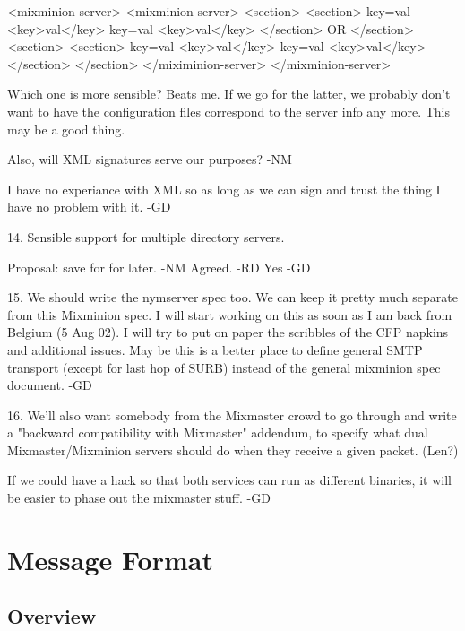     <mixminion-server>            <mixminion-server>
      <section>                      <section>
      key=val                           <key>val</key>
      key=val                           <key>val</key>
      </section>         OR          </section>        
      <section>                      <section>
      key=val                           <key>val</key>
      key=val                           <key>val</key>
      </section>                     </section>        
    </miximinion-server>         </mixminion-server>

    Which one is more sensible?  Beats me.  If we go for the latter,
    we probably don't want to have the configuration files correspond
    to the server info any more.  This may be a good thing.

    Also, will XML signatures serve our purposes? -NM

    I have no experiance with XML so as long as we can sign and trust
    the thing I have no problem with it. -GD

14. Sensible support for multiple directory servers.

    Proposal: save for for later. -NM
    Agreed. -RD
    Yes -GD

15. We should write the nymserver spec too. We can keep it pretty much
    separate from this Mixminion spec.
    I will start working on this as soon as I am back from Belgium (5
    Aug 02). I will try to put on paper the scribbles of the CFP
    napkins and additional issues. May be this is a better place to
    define general SMTP transport (except for last hop of SURB)
    instead of the general mixminion spec document. -GD

16. We'll also want somebody from the Mixmaster crowd to go through and
    write a "backward compatibility with Mixmaster" addendum, to specify
    what dual Mixmaster/Mixminion servers should do when they receive a
    given packet. (Len?)

    If we could have a hack so that both services can run as different
    binaries, it will be easier to phase out the mixmaster stuff. -GD

\section{Message Format}


\subsection{Overview}


